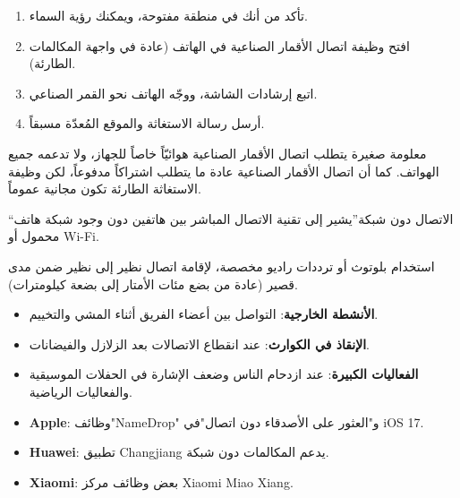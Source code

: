 
\begin{enumerate}
  \item تأكد من أنك في منطقة مفتوحة، ويمكنك رؤية السماء.
  \item افتح وظيفة اتصال الأقمار الصناعية في الهاتف (عادة في واجهة المكالمات الطارئة).
  \item اتبع إرشادات الشاشة، ووجّه الهاتف نحو القمر الصناعي.
  \item أرسل رسالة الاستغاثة والموقع المُعدّة مسبقاً.
\end{enumerate}

\begin{tcbinfo}{معلومة صغيرة}
يتطلب اتصال الأقمار الصناعية هوائيّاً خاصاً للجهاز، ولا تدعمه جميع الهواتف. كما أن اتصال الأقمار الصناعية عادة ما يتطلب اشتراكاً مدفوعاً، لكن وظيفة الاستغاثة الطارئة تكون مجانية عموماً.

\end{tcbinfo}


“الاتصال دون شبكة”يشير إلى تقنية الاتصال المباشر بين هاتفين دون وجود شبكة هاتف محمول أو Wi-Fi.


استخدام بلوتوث أو ترددات راديو مخصصة، لإقامة اتصال نظير إلى نظير ضمن مدى قصير (عادة من بضع مئات الأمتار إلى بضعة كيلومترات).


\begin{itemize}
  \item \textbf{الأنشطة الخارجية}: التواصل بين أعضاء الفريق أثناء المشي والتخييم.
  \item \textbf{الإنقاذ في الكوارث}: عند انقطاع الاتصالات بعد الزلازل والفيضانات.
  \item \textbf{الفعاليات الكبيرة}: عند ازدحام الناس وضعف الإشارة في الحفلات الموسيقية والفعاليات الرياضية.
\end{itemize}


\begin{itemize}
  \item \textbf{Apple}: وظائف"NameDrop" و"العثور على الأصدقاء دون اتصال"في iOS 17.
  \item \textbf{Huawei}: تطبيق Changjiang يدعم المكالمات دون شبكة.
  \item \textbf{Xiaomi}: بعض وظائف مركز Xiaomi Miao Xiang.
\end{itemize}

